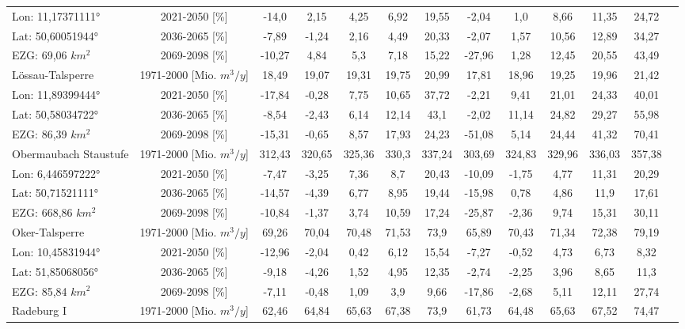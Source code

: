 \begin{longtable}{@{\extracolsep{\fill}}lc|ccccc||cccccc}
\cline{2-13} 
Lon: 11,17371111° & 2021-2050 [\%]  & -14,0 & 2,15 & 4,25 & 6,92 & 19,55 & -2,04 & 1,0 & 8,66 & 11,35 & 24,72 & \\ 
Lat: 50,60051944° & 2036-2065 [\%]  & -7,89 & -1,24 & 2,16 & 4,49 & 20,33 & -2,07 & 1,57 & 10,56 & 12,89 & 34,27 & \\ 
EZG: 69,06 $km^2$ & 2069-2098 [\%]  & -10,27 & 4,84 & 5,3 & 7,18 & 15,22 & -27,96 & 1,28 & 12,45 & 20,55 & 43,49 & \\ 
\hline 
Lössau-Talsperre & 1971-2000 [Mio. $m^3/y$]  & 18,49 & 19,07 & 19,31 & 19,75 & 20,99 & 17,81 & 18,96 & 19,25 & 19,96 & 21,42 & \\ 
\cline{2-13} 
Lon: 11,89399444° & 2021-2050 [\%]  & -17,84 & -0,28 & 7,75 & 10,65 & 37,72 & -2,21 & 9,41 & 21,01 & 24,33 & 40,01 & \\ 
Lat: 50,58034722° & 2036-2065 [\%]  & -8,54 & -2,43 & 6,14 & 12,14 & 43,1 & -2,02 & 11,14 & 24,82 & 29,27 & 55,98 & \\ 
EZG: 86,39 $km^2$ & 2069-2098 [\%]  & -15,31 & -0,65 & 8,57 & 17,93 & 24,23 & -51,08 & 5,14 & 24,44 & 41,32 & 70,41 & \\ 
\hline 
Obermaubach Staustufe & 1971-2000 [Mio. $m^3/y$]  & 312,43 & 320,65 & 325,36 & 330,3 & 337,24 & 303,69 & 324,83 & 329,96 & 336,03 & 357,38 & \\ 
\cline{2-13} 
Lon: 6,446597222° & 2021-2050 [\%]  & -7,47 & -3,25 & 7,36 & 8,7 & 20,43 & -10,09 & -1,75 & 4,77 & 11,31 & 20,29 & \\ 
Lat: 50,71521111° & 2036-2065 [\%]  & -14,57 & -4,39 & 6,77 & 8,95 & 19,44 & -15,98 & 0,78 & 4,86 & 11,9 & 17,61 & \\ 
EZG: 668,86 $km^2$ & 2069-2098 [\%]  & -10,84 & -1,37 & 3,74 & 10,59 & 17,24 & -25,87 & -2,36 & 9,74 & 15,31 & 30,11 & \\ 
\hline 
Oker-Talsperre & 1971-2000 [Mio. $m^3/y$]  & 69,26 & 70,04 & 70,48 & 71,53 & 73,9 & 65,89 & 70,43 & 71,34 & 72,38 & 79,19 & \\ 
\cline{2-13} 
Lon: 10,45831944° & 2021-2050 [\%]  & -12,96 & -2,04 & 0,42 & 6,12 & 15,54 & -7,27 & -0,52 & 4,73 & 6,73 & 8,32 & \\ 
Lat: 51,85068056° & 2036-2065 [\%]  & -9,18 & -4,26 & 1,52 & 4,95 & 12,35 & -2,74 & -2,25 & 3,96 & 8,65 & 11,3 & \\ 
EZG: 85,84 $km^2$ & 2069-2098 [\%]  & -7,11 & -0,48 & 1,09 & 3,9 & 9,66 & -17,86 & -2,68 & 5,11 & 12,11 & 27,74 & \\ 
\hline 
Radeburg I & 1971-2000 [Mio. $m^3/y$]  & 62,46 & 64,84 & 65,63 & 67,38 & 73,9 & 61,73 & 64,48 & 65,63 & 67,52 & 74,47 & \\ 

\end{longtable}
